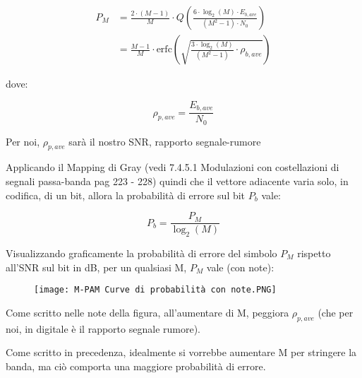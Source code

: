{
    \Large 
    \begin{equation}
        \begin{split}
            P_M 
            &= 
            \frac{2 \cdot (M-1)}{M}
            \cdot 
            Q
            \left(
                \frac{6 \cdot \log_{2} (M) \cdot E_{b, ave}}{(M^{2} - 1) \cdot N_0}
            \right)
            \\
            &= 
            \frac{M - 1}{M}
            \cdot 
            \text{erfc}
            \left(
                \sqrt{
                \frac{3 \cdot \log_{2} (M)}{(M^{2} - 1)}
                \cdot 
                \rho_{b, ave}
                }
            \right)
        \end{split}
    \end{equation}
}

dove: 

{
    \Large 
    \begin{equation}
        \rho_{p, ave} 
        =
        \frac{E_{b, ave}}{N_0}
    \end{equation}
}

\begin{tcolorbox}
    Per noi, $ \rho_{p, ave} $ sarà il nostro SNR, rapporto segnale-rumore
\end{tcolorbox}


Applicando il Mapping di Gray (vedi 7.4.5.1 Modulazioni con costellazioni di segnali passa-banda pag 223 - 228) 
quindi che il vettore adiacente varia solo, in codifica, di un bit, 
allora la probabilità di errore sul bit $P_b$ vale: 

{
    \Large 
    \begin{equation}
        P_b 
        = 
        \frac{P_M}{\log_{2} (M)} 
    \end{equation}
}

Visualizzando graficamente la probabilità di errore del simbolo $P_M$ rispetto all'SNR sul bit in dB, 
per un qualsiasi M, $P_M$ vale (con note): 

\begin{figure}[h]
    \centering
    \texttt{[image: M-PAM Curve di probabilità con note.PNG]}
\end{figure} 

Come scritto nelle note della figura, all'aumentare di M, 
peggiora $\rho_{p, ave} $ (che per noi, in digitale è il rapporto segnale rumore). \newline 

Come scritto in precedenza, idealmente si vorrebbe aumentare M per stringere la banda, 
ma ciò comporta una maggiore probabilità di errore. \newline 

